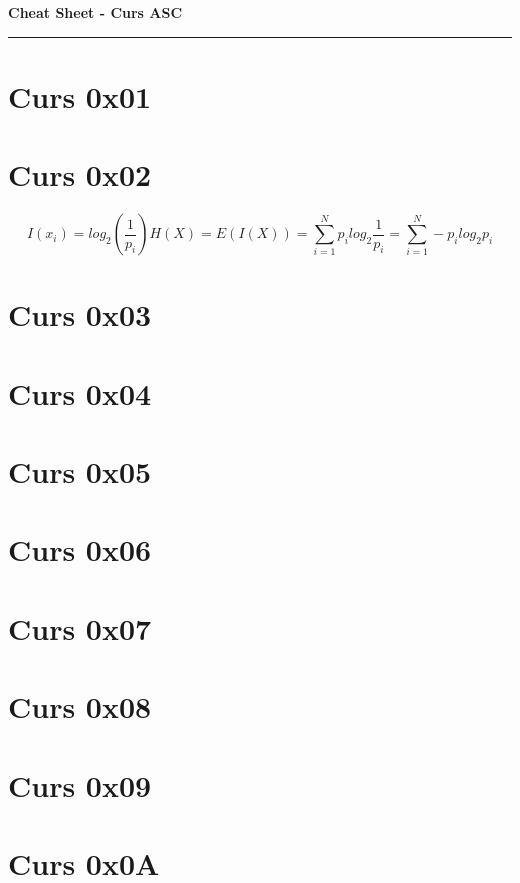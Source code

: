 \documentclass[a4paper]{article}
\newenvironment{definition}[1]
    {\par\noindent\begin{tcolorbox}[colback=blue!5!white,colframe=blue!75!black,title=#1,fonttitle=\bfseries,boxsep=1mm,left=1mm,right=1mm,top=1mm,bottom=1mm]}
    {\end{tcolorbox}}
\begin{document}
\noindent
\textbf{\small Cheat Sheet - Curs ASC}
\hrule
\vspace{1ex}

\pagestyle{empty}
\footnotesize
\section{Curs 0x01}

\section{Curs 0x02}
$$I(x_i) = log_2(\frac{1}{p_i}) H(X) = E(I(X)) = \sum_{i = 1}^{N}p_i log_2\frac{1}{p_i} = \sum_{i = 1}^{N} - p_i log_2 p_i$$


\section{Curs 0x03}

\section{Curs 0x04}

\section{Curs 0x05}

\section{Curs 0x06}

\section{Curs 0x07}

\section{Curs 0x08}

\section{Curs 0x09}

\section{Curs 0x0A}

\begin{multicols}{2}




\end{multicols}
\end{document}

